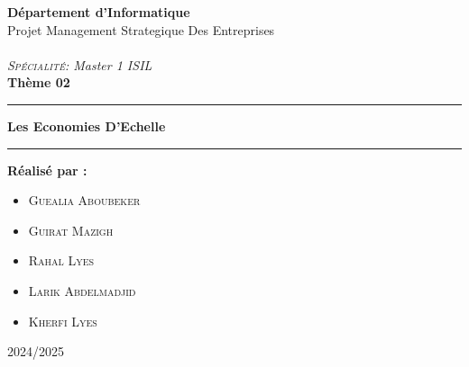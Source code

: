 \begin{titlepage}
\begin{center}
  { \textbf{D\'epartement d'Informatique}}\\ \vspace{0.8cm}
  \Huge{\large{Projet Management Strategique Des Entreprises }} \\ \\\vspace{0.3cm}
  \large{\emph{\textsc{Spécialité:} Master 1 ISIL}}\\ \vspace{0.8cm}
  \huge{\textbf{Thème 02}}\\ %
  \noindent\rule{\textwidth}{1mm}
  \Large{\textbf{Les Economies D'Echelle }}
  \noindent\rule{\textwidth}{1mm}
  \end{center}
  \vspace{0.3cm}
\begin{center}
  \textbf{Réalisé par :}\\
  \begin{itemize}
    \item \textsc{Guealia Aboubeker} 
    \item \textsc{Guirat Mazigh} 
    \item \textsc{Rahal Lyes}
    \item \textsc{Larik Abdelmadjid}
    \item \textsc{Kherfi Lyes}
  \end{itemize}
\end{center}
  \vspace{2.5cm}
  \begin{center}
  2024/2025
  \end{center}
  
  \end{titlepage}